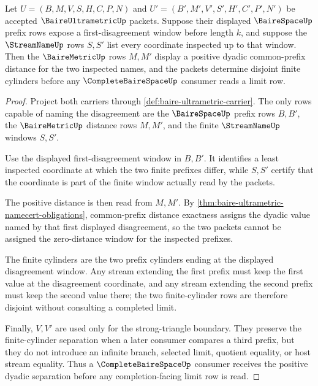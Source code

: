 \begin{theorem}
\label{thm:baire-ultrametric-finite-cylinder-separation}
Let $U=(B,M,V,S,H,C,P,N)$ and $U'=(B',M',V',S',H',C',P',N')$ be accepted $\BaireUltrametricUp$ packets. Suppose their displayed $\BaireSpaceUp$ prefix rows expose a first-disagreement window before length $k$, and suppose the $\StreamNameUp$ rows $S,S'$ list every coordinate inspected up to that window. Then the $\BaireMetricUp$ rows $M,M'$ display a positive dyadic common-prefix distance for the two inspected names, and the packets determine disjoint finite cylinders before any $\CompleteBaireSpaceUp$ consumer reads a limit row.
\end{theorem}
\begin{proof}
Project both carriers through \autoref{def:baire-ultrametric-carrier}. The only rows capable of naming the disagreement are the $\BaireSpaceUp$ prefix rows $B,B'$, the $\BaireMetricUp$ distance rows $M,M'$, and the finite $\StreamNameUp$ windows $S,S'$.

Use the displayed first-disagreement window in $B,B'$. It identifies a least inspected coordinate at which the two finite prefixes differ, while $S,S'$ certify that the coordinate is part of the finite window actually read by the packets.

The positive distance is then read from $M,M'$. By \autoref{thm:baire-ultrametric-namecert-obligations}, common-prefix distance exactness assigns the dyadic value named by that first displayed disagreement, so the two packets cannot be assigned the zero-distance window for the inspected prefixes.

The finite cylinders are the two prefix cylinders ending at the displayed disagreement window. Any stream extending the first prefix must keep the first value at the disagreement coordinate, and any stream extending the second prefix must keep the second value there; the two finite-cylinder rows are therefore disjoint without consulting a completed limit.

Finally, $V,V'$ are used only for the strong-triangle boundary. They preserve the finite-cylinder separation when a later consumer compares a third prefix, but they do not introduce an infinite branch, selected limit, quotient equality, or host stream equality. Thus a $\CompleteBaireSpaceUp$ consumer receives the positive dyadic separation before any completion-facing limit row is read.
\end{proof}


